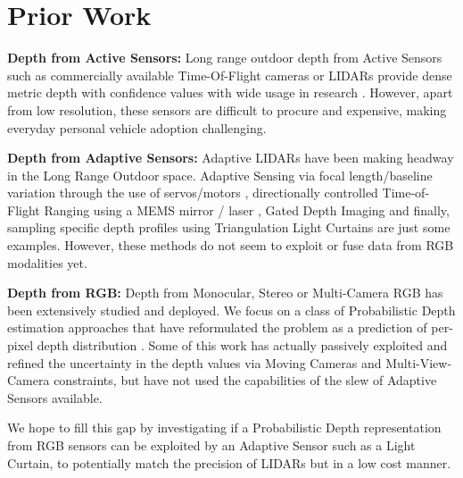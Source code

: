\section{Prior Work}

\textbf{Depth from Active Sensors: } Long range outdoor depth from Active Sensors such as commercially available Time-Of-Flight cameras \cite{quanergy} \cite{luminar} or LIDARs \cite{velodyne}  \cite{ouster} provide dense metric depth with confidence values with wide usage in research \cite{Geiger2013IJRR} \cite{caesar2020nuscenes}  \cite{chang2019argoverse}. However, apart from low resolution, these sensors are difficult to procure and expensive, making everyday personal vehicle adoption challenging.

\textbf{Depth from Adaptive Sensors: } Adaptive LIDARs have been making headway in the Long Range Outdoor space. Adaptive Sensing via focal length/baseline variation through the use of servos/motors \cite{Mohamed2018ActiveSP} \cite{4587671} \cite{Nakabo2005VariableBS} \cite{Schneider2018VisuallyGV}, directionally controlled Time-of-Flight Ranging using a MEMS mirror / laser \cite{dtof} \cite{9105183} \cite{pittaluga2020} \cite{8369664}, Gated Depth Imaging \cite{walz2020uncertainty} \cite{gruber2019gated2depth} \cite{10.1117/12.2078169} and finally, sampling specific depth profiles using Triangulation Light Curtains \cite{bartels2019Agile} \cite{wang2018programmable} \cite{Ancha_2020_ECCV} are just some examples. However, these methods do not seem to exploit or fuse data from RGB modalities yet.

\textbf{Depth from RGB: } Depth from Monocular, Stereo or Multi-Camera RGB has been extensively studied and deployed. We focus on a class of Probabilistic Depth estimation approaches that have reformulated the problem as a prediction of per-pixel depth distribution \cite{liu2019neural} \cite{yang2019inferring} \cite{chang2018pyramid} \cite{yao2018mvsnet} \cite{ilg2018uncertainty} \cite{xia2019generating}. Some of this work has actually passively exploited and refined \cite{liu2019neural} \cite{xia2019generating} the uncertainty in the depth values via Moving Cameras and Multi-View-Camera constraints, but have not used the capabilities of the slew of Adaptive Sensors available. 

We hope to fill this gap by investigating if a Probabilistic Depth representation from RGB sensors can be exploited by an Adaptive Sensor such as a Light Curtain, to potentially match the precision of LIDARs but in a low cost manner.